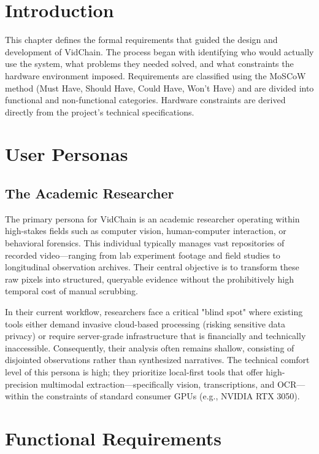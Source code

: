 \section{Introduction}

This chapter defines the formal requirements that guided the design and development of VidChain. The process began with identifying who would actually use the system, what problems they needed solved, and what constraints the hardware environment imposed. Requirements are classified using the MoSCoW method (Must Have, Should Have, Could Have, Won't Have) and are divided into functional and non-functional categories. Hardware constraints are derived directly from the project's technical specifications.

\section{User Personas}

\subsection{The Academic Researcher}

The primary persona for VidChain is an academic researcher operating within high-stakes fields such as computer vision, human-computer interaction, or behavioral forensics. This individual typically manages vast repositories of recorded video—ranging from lab experiment footage and field studies to longitudinal observation archives. Their central objective is to transform these raw pixels into structured, queryable evidence without the prohibitively high temporal cost of manual scrubbing. 

In their current workflow, researchers face a critical "blind spot" where existing tools either demand invasive cloud-based processing (risking sensitive data privacy) or require server-grade infrastructure that is financially and technically inaccessible. Consequently, their analysis often remains shallow, consisting of disjointed observations rather than synthesized narratives. The technical comfort level of this persona is high; they prioritize local-first tools that offer high-precision multimodal extraction—specifically vision, transcriptions, and OCR—within the constraints of standard consumer GPUs (e.g., NVIDIA RTX 3050).

\section{Functional Requirements}

